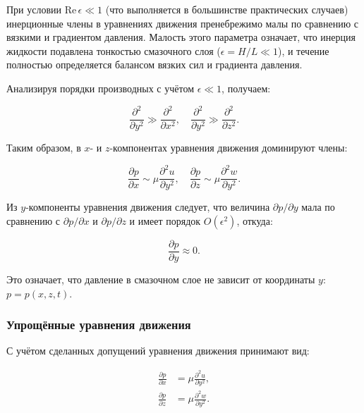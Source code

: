 При условии $\mathrm{Re}\,\epsilon \ll 1$ (что выполняется в большинстве практических случаев) инерционные члены в уравнениях движения пренебрежимо малы по сравнению с вязкими и градиентом давления. Малость этого параметра означает, что инерция жидкости подавлена тонкостью смазочного слоя ($\epsilon = H/L \ll 1$), и течение полностью определяется балансом вязких сил и градиента давления.

Анализируя порядки производных с учётом $\epsilon \ll 1$, получаем:

\begin{equation}
\frac{\partial^2}{\partial y^2} \gg \frac{\partial^2}{\partial x^2}, \quad \frac{\partial^2}{\partial y^2} \gg \frac{\partial^2}{\partial z^2}.
\end{equation}

Таким образом, в $x$- и $z$-компонентах уравнения движения доминируют члены:

\begin{equation}
\frac{\partial p}{\partial x} \sim \mu\frac{\partial^2 u}{\partial y^2}, \quad \frac{\partial p}{\partial z} \sim \mu\frac{\partial^2 w}{\partial y^2}.
\end{equation}

Из $y$-компоненты уравнения движения следует, что величина $\partial p/\partial y$ мала по сравнению с $\partial p/\partial x$ и $\partial p/\partial z$ и имеет порядок $O(\epsilon^2)$, откуда:

\begin{equation}
\frac{\partial p}{\partial y} \approx 0.
\label{eq:dp_dy_zero}
\end{equation}

Это означает, что давление в смазочном слое не зависит от координаты $y$: $p = p(x, z, t)$.

\subsubsection*{Упрощённые уравнения движения}

С учётом сделанных допущений уравнения движения принимают вид:

\begin{equation}
\label{eq:simplified_xz}
\begin{aligned}
\frac{\partial p}{\partial x} &= \mu\frac{\partial^2 u}{\partial y^2}, \\
\frac{\partial p}{\partial z} &= \mu\frac{\partial^2 w}{\partial y^2}.
\end{aligned}
\end{equation}

